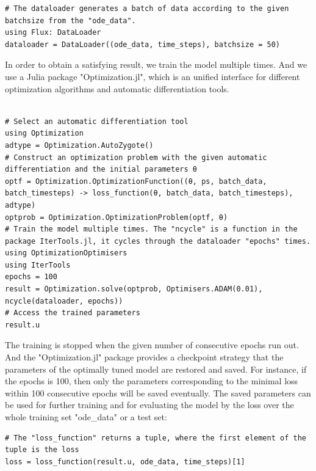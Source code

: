 \documentclass[
	parskip, 			   %
	twoside, 			   %
	DIV=14, 			   %
	BCOR=15.0mm, 		   %
	headsepline, 		   %
	open=right, 		   %
	captions=tableheading, %
	bibliography=totoc,    %
	numbers=noenddot       %
]{scrreprt}
\begin{document}
\begin{verbatim}
# The dataloader generates a batch of data according to the given batchsize from the "ode_data".
using Flux: DataLoader
dataloader = DataLoader((ode_data, time_steps), batchsize = 50)
\end{verbatim}

In order to obtain a satisfying result, we train the model multiple times. And we use a Julia package "Optimization.jl", which is an unified interface for different optimization algorithms and automatic differentiation tools.

\begin{verbatim}

# Select an automatic differentiation tool
using Optimization
adtype = Optimization.AutoZygote()
# Construct an optimization problem with the given automatic differentiation and the initial parameters θ
optf = Optimization.OptimizationFunction((θ, ps, batch_data, batch_timesteps) -> loss_function(θ, batch_data, batch_timesteps), adtype)
optprob = Optimization.OptimizationProblem(optf, θ)
# Train the model multiple times. The "ncycle" is a function in the package IterTools.jl, it cycles through the dataloader "epochs" times.
using OptimizationOptimisers
using IterTools
epochs = 100
result = Optimization.solve(optprob, Optimisers.ADAM(0.01), ncycle(dataloader, epochs))
# Access the trained parameters
result.u
\end{verbatim}

The training is stopped when the given number of consecutive epochs run out. And the "Optimization.jl" package provides a checkpoint strategy that the parameters of the optimally tuned model are restored and saved. For instance, if the epochs is 100, then only the parameters corresponding to the minimal loss within 100 consecutive epochs will be saved eventually.  The saved parameters can be used for further training and for evaluating the model by the loss over the whole training set "ode\_data" or a test set:
\begin{verbatim}
# The "loss_function" returns a tuple, where the first element of the tuple is the loss
loss = loss_function(result.u, ode_data, time_steps)[1]
\end{verbatim}
\end{document}

